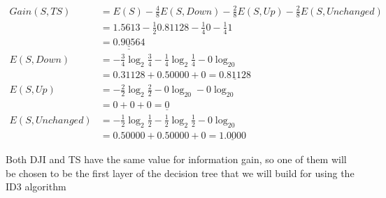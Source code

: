 \documentclass[a4,12pt]{extarticle}
\newcommand{\uunderline}[1]{\underline{\underline{#1}}}
\begin{document}
\begin{align*}
Gain(S,TS) &= E(S) - \frac{4}{8}E(S,Down) - \frac{2}{8}E(S,Up) - \frac{2}{8}E(S,Unchanged) \\
           &= 1.5613 - \frac{1}{2}0.81128 - \frac{1}{4}0 - \frac{1}{4}1 \\
           &= \uunderline{0.90564}\\
E(S,Down) &= -\frac{3}{4}\log_2\frac{3}{4} -\frac{1}{4}\log_2\frac{1}{4} -0\log_20\\
          &= 0.31128 + 0.50000 + 0 = \underline{0.81128}\\
E(S,Up) &= -\frac{2}{2}\log_2\frac{2}{2} -0\log_20 -0\log_20\\
        &= 0 + 0 + 0 = \underline{0}\\
E(S,Unchanged) &= -\frac{1}{2}\log_2\frac{1}{2} -\frac{1}{2}\log_2\frac{1}{2} -0\log_20\\
               &= 0.50000 + 0.50000 + 0 = \underline{1.0000}
\end{align*}

Both DJI and TS have the same value for information gain, so one of them will be chosen to be the first layer of the decision tree that we will build for using the ID3 algorithm
\end{document}
